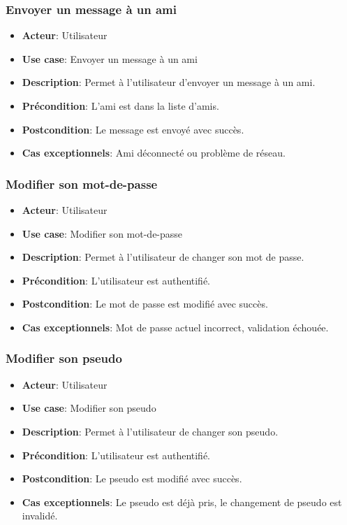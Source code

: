 \documentclass{article}
\begin{document}
\subsubsection*{Envoyer un message à un ami}
\begin{itemize}
    \item \textbf{Acteur}: Utilisateur
    \item \textbf{Use case}: Envoyer un message à un ami
    \item \textbf{Description}: Permet à l'utilisateur d'envoyer un message à un ami.
    \item \textbf{Précondition}: L'ami est dans la liste d'amis.
    \item \textbf{Postcondition}: Le message est envoyé avec succès.
    \item \textbf{Cas exceptionnels}: Ami déconnecté ou problème de réseau.
\end{itemize}

\subsubsection*{Modifier son mot-de-passe}
\begin{itemize}
    \item \textbf{Acteur}: Utilisateur
    \item \textbf{Use case}: Modifier son mot-de-passe
    \item \textbf{Description}: Permet à l'utilisateur de changer son mot de passe.
    \item \textbf{Précondition}: L'utilisateur est authentifié.
    \item \textbf{Postcondition}: Le mot de passe est modifié avec succès.
    \item \textbf{Cas exceptionnels}: Mot de passe actuel incorrect, validation échouée.
\end{itemize}

\subsubsection*{Modifier son pseudo}
\begin{itemize}
    \item \textbf{Acteur}: Utilisateur
    \item \textbf{Use case}: Modifier son pseudo
    \item \textbf{Description}: Permet à l'utilisateur de changer son pseudo.
    \item \textbf{Précondition}: L'utilisateur est authentifié.
    \item \textbf{Postcondition}: Le pseudo est modifié avec succès.
    \item \textbf{Cas exceptionnels}: Le pseudo est déjà pris, le changement de pseudo est invalidé.
\end{itemize}
\end{document}
